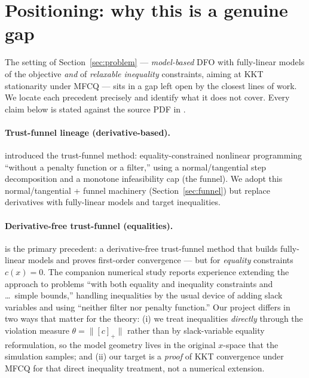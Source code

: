 \section{Positioning: why this is a genuine gap}
\label{sec:positioning}

The setting of Section~\ref{sec:problem} --- \emph{model-based} DFO with
fully-linear models of the objective \emph{and} of \emph{relaxable inequality}
constraints, aiming at KKT stationarity under MFCQ --- sits in a gap left open by
the closest lines of work. We locate each precedent precisely and identify what
it does not cover. Every claim below is stated against the source PDF in
.

\paragraph{Trust-funnel lineage (derivative-based).}
\citet{GouldToint2010} introduced the trust-funnel method: equality-constrained
nonlinear programming ``without a penalty function or a filter,'' using a
normal/tangential step decomposition and a monotone infeasibility cap (the
funnel). We adopt this normal/tangential + funnel machinery
(Section~\ref{sec:funnel}) but replace derivatives with fully-linear models and
target inequalities.

\paragraph{Derivative-free trust-funnel (equalities).}
\citet{SampaioToint2015} is the primary precedent: a derivative-free trust-funnel
method that builds fully-linear models and proves first-order convergence --- but
for \emph{equality} constraints $c(x)=0$. The companion numerical study
\citep{SampaioToint2016} reports experience extending the approach to problems
``with both equality and inequality constraints and \dots\ simple bounds,''
handling inequalities by the usual device of adding slack variables and using
``neither filter nor penalty function.'' Our project differs in two ways that
matter for the theory: (i) we treat inequalities \emph{directly} through the
violation measure $\theta=\|[c]_+\|$ rather than by slack-variable
equality reformulation, so the model geometry lives in the original $x$-space that
the simulation samples; and (ii) our target is a \emph{proof} of KKT convergence
under MFCQ for that direct inequality treatment, not a numerical extension.

